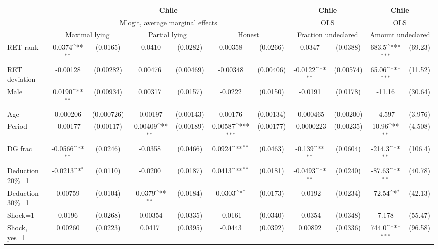 \def\sym#1{\ifmmode^{#1}\else\(^{#1}\)\fi}
\begin{tabular}{l|cccccc|cc|cc}
\hline\hline
&\multicolumn{6}{c|}{\bf Chile}&\multicolumn{2}{c|}{\bf Chile}&\multicolumn{2}{c}{\bf Chile}\\ &\multicolumn{6}{c|}{Mlogit, average marginal effects }&\multicolumn{2}{c|}{OLS}&\multicolumn{2}{c}{OLS}\\
                &\multicolumn{2}{c}{Maximal lying}&\multicolumn{2}{c}{Partial lying}&\multicolumn{2}{c}{Honest}  &\multicolumn{2}{c}{Fraction undeclared}&\multicolumn{2}{c}{Amount undeclared}\\
\hline
RET rank        &   0.0374\sym{**} & (0.0165)&  -0.0410         & (0.0282)&  0.00358         & (0.0266)&   0.0347         & (0.0388)&    683.5\sym{***}&  (69.23)\\
RET deviation   & -0.00128         &(0.00282)&  0.00476         &(0.00469)& -0.00348         &(0.00406)&  -0.0122\sym{**} &(0.00574)&    65.06\sym{***}&  (11.52)\\
Male            &   0.0190\sym{**} &(0.00934)&  0.00317         & (0.0157)&  -0.0222         & (0.0150)&  -0.0191         & (0.0178)&   -11.16         &  (30.64)\\
Age             & 0.000206         &(0.000726)& -0.00197         &(0.00143)&  0.00176         &(0.00134)&-0.000465         &(0.00200)&   -4.597         &  (3.976)\\
Period          & -0.00177         &(0.00117)& -0.00409\sym{**} &(0.00189)&  0.00587\sym{***}&(0.00177)&-0.0000223         &(0.00235)&    10.96\sym{**} &  (4.508)\\
DG frac         &  -0.0566\sym{**} & (0.0246)&  -0.0358         & (0.0466)&   0.0924\sym{**} & (0.0463)&   -0.139\sym{**} & (0.0604)&   -214.3\sym{**} &  (106.4)\\
Deduction 20\%=1&  -0.0213\sym{*}  & (0.0110)&  -0.0200         & (0.0187)&   0.0413\sym{**} & (0.0181)&  -0.0493\sym{**} & (0.0240)&   -87.63\sym{**} &  (40.78)\\
Deduction 30\%=1&  0.00759         & (0.0104)&  -0.0379\sym{**} & (0.0184)&   0.0303\sym{*}  & (0.0173)&  -0.0192         & (0.0234)&   -72.54\sym{*}  &  (42.13)\\
Shock=1         &   0.0196         & (0.0268)& -0.00354         & (0.0335)&  -0.0161         & (0.0340)&  -0.0354         & (0.0348)&    7.178         &  (55.47)\\
Shock, yes=1    &  0.00260         & (0.0223)&   0.0417         & (0.0395)&  -0.0443         & (0.0392)&  0.00892         & (0.0336)&    744.0\sym{***}&  (96.58)\\

\end{tabular}
